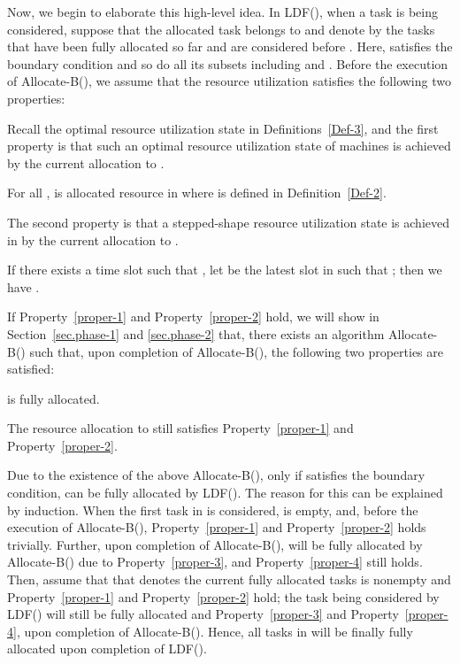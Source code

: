 \documentclass[10pt,journal,compsoc]{IEEEtran}
\begin{document}
Now, we begin to elaborate this high-level idea. In LDF(), when a task  is being considered, suppose that the allocated task  belongs to  and denote by  the tasks that have been fully allocated so far and are considered before . Here,  satisfies the boundary condition and so do all its subsets including  and .  Before the execution of Allocate-B(), we assume that the resource utilization satisfies the following two properties:



Recall the optimal resource utilization state in Definitions~\ref{Def-3}, and the first property is that such an optimal resource utilization state of  machines is achieved by the current allocation to .
\begin{property}\label{proper-1}
For all ,  is allocated  resource in  where  is defined in Definition~\ref{Def-2}.
\end{property}


The second property is that a stepped-shape resource utilization state is achieved in  by the current allocation to .
\begin{property}\label{proper-2}
If there exists a time slot  such that , let  be the latest slot in  such that ; then we have .
\end{property}

If Property~\ref{proper-1} and Property~\ref{proper-2} hold, we will show in Section~\ref{sec.phase-1} and \ref{sec.phase-2} that, there exists an algorithm Allocate-B() such that, upon completion of Allocate-B(), the following two properties are satisfied:

\begin{property}\label{proper-3}
 is fully allocated.
\end{property}

\begin{property}\label{proper-4}
The resource allocation to  still satisfies Property~\ref{proper-1} and Property~\ref{proper-2}.
\end{property}
Due to the existence of the above Allocate-B(), only if  satisfies the boundary condition,  can be fully allocated by LDF(). The reason for this can be explained by induction. When the first task  in  is considered,  is empty, and, before the execution of Allocate-B(), Property~\ref{proper-1} and Property~\ref{proper-2} holds trivially. Further, upon completion of Allocate-B(),  will be fully allocated by Allocate-B() due to Property~\ref{proper-3}, and Property~\ref{proper-4} still holds. Then, assume that  that denotes the current fully allocated tasks is nonempty and Property~\ref{proper-1} and Property~\ref{proper-2} hold; the task  being considered by LDF() will still be fully allocated and Property~\ref{proper-3} and Property~\ref{proper-4}, upon completion of Allocate-B(). Hence, all tasks in  will be finally fully allocated upon completion of LDF().
\end{document}
